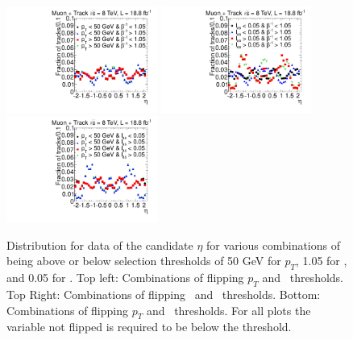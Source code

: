 \begin{figure}
\begin{center}
\includegraphics[clip=true, trim=0.0cm 0cm 3.0cm 0cm, width=0.44\textwidth]{figures/tkmu/Selection_Data8TeV_EtaRegionsPtTOF_016}
\includegraphics[clip=true, trim=0.0cm 0cm 3.0cm 0cm, width=0.44\textwidth]{figures/tkmu/Selection_Data8TeV_EtaRegionsTOFdEdx_016} \\
\includegraphics[clip=true, trim=0.0cm 0cm 3.0cm 0cm, width=0.44\textwidth]{figures/tkmu/Selection_Data8TeV_EtaRegionsPtdEdx_016}
\end{center}
\caption[Distribution for data of the candidate $\eta$ for various combinations of being above or below selection thresholds in the \tktof\ analysis]
{Distribution for data of the candidate $\eta$ for various combinations of being above or below selection thresholds of
50 GeV for $p_T$, 1.05 for \invbeta, and 0.05 for \ias.
Top left: Combinations of flipping $p_T$ and \invbeta\ thresholds. Top Right: Combinations of flipping \invbeta\ and \ias\ thresholds.
Bottom: Combinations of flipping $p_T$ and \ias\ thresholds. For all plots the variable not flipped is required to be below the threshold.}
\label{fig:etacorrelation}
\end{figure}

